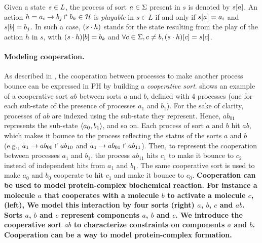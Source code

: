 \documentclass[11pt,a4paper,twoside]{epig}
\begin{document}
\noindent
Given a state $s\in L$, the process of sort $a\in\Sigma$ present in $s$ is denoted by ${s[a]}$.
An action $h=a_i\rightarrow b_j\Rsh b_k \in \mathcal{H}$ is \emph{playable} in $s \in L$ if and only if ${s[a]}=a_i$ and ${s[b]} = b_j$.
In such a case, $(s\cdot h)$ stands for the state resulting from the play of the action $h$ in $s$, with
${(s\cdot h)[b]} = b_k$ and $\forall c \in \Sigma, c \neq b, {(s\cdot h)[c]} = {s[c]}$.

\paragraph{Modeling cooperation.}

As described in \cite{PMR10-TCSB}, the cooperation between processes to make another process bounce can be
expressed in PH by building a \emph{cooperative sort}.
 shows an example of a cooperative sort $ab$ between sorts $a$ and $b$,
defined with 4 processes (one for each sub-state of the presence of processes $a_1$ and $b_1$).
For the sake of clarity, processes of $ab$ are indexed using the sub-state they represent.
Hence, $ab_{01}$ represents the sub-state $\langle a_0,b_1 \rangle$, and so on.
Each process of sort $a$ and $b$ hit $ab$, which makes it bounce to the process reflecting the status of the sorts $a$
and $b$ (e.g., $a_1\rightarrow ab_{00}\Rsh ab_{10}$ and $a_1\rightarrow ab_{01}\Rsh ab_{11}$).
Then, to represent the cooperation between processes $a_1$ and $b_1$,
the process $ab_{11}$ hits $c_1$ to make it bounce to $c_2$ instead of
independent hits from $a_1$ and $b_1$.
The same cooperative sort is used to make $a_0$ and $b_0$ cooperate to hit $c_1$ and make it bounce to $c_0$.
\textbf{Cooperation can be used to model protein-complex biochemical reaction.
For instance a molecule $a$ that cooperates with a molecule $b$ to activate a molecule $c$, 
 (left),  
We model this interaction by four sorts  (right) $a$, $b$, $c$ and $ab$. Sorts $a$, $b$ and $c$
represent components $a$, $b$ and $c$. We introduce the cooperative sort $ab$ to characterize constraints on 
components $a$ and $b$. Cooperation can be a way to model protein-complex formation.}
\end{document}
